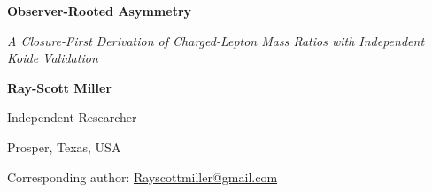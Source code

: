 \documentclass[11pt]{article}
\begin{document}
\begin{center}
{\LARGE\bfseries Observer-Rooted Asymmetry\par}
\vspace{0.7em}
{\large\itshape A Closure-First Derivation of Charged-Lepton Mass Ratios with Independent Koide Validation\par}
\vspace{0.7em}
{\normalsize\bfseries Ray-Scott Miller\par}
\vspace{0.2em}
{\small Independent Researcher\par}
{\small Prosper, Texas, USA\par}
{\small Corresponding author: \href{mailto:Rayscottmiller@gmail.com}{Rayscottmiller@gmail.com}\par}
\end{center}
\vspace{0.7em}
\end{document}
